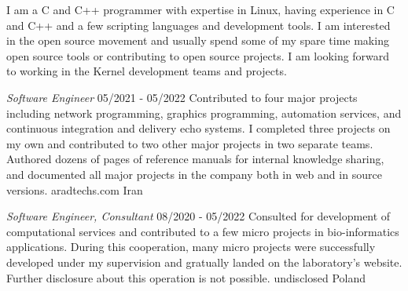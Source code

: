 \documentclass[a4paper,12pt]{memoir} %
\begin{document}
\userinformation %

\framebreak %


\CVDate




{I am a C and C++ programmer with expertise in Linux, having experience in C and C++ and a few scripting languages and development tools. I am interested in the open source movement and usually spend some of my spare time making open source tools or contributing to open source projects. I am looking forward to working in the Kernel development teams and projects.}


\SmallSep %




{\textit{Software Engineer}}
{05/2021 - 05/2022}
{Contributed to four major projects including
network programming, graphics programming,
automation services, and continuous integration
and delivery echo systems.
I completed three projects on my own and
contributed to two other major projects
in two separate teams.
Authored dozens of pages of reference manuals
for internal knowledge sharing, and documented
all major projects in the company both in web and 
in source versions.}
{aradtechs.com}
{Iran}


{\textit{Software Engineer, Consultant}}
{08/2020 - 05/2022}
{Consulted for development of computational
services and contributed to a few micro projects
in bio-informatics applications.
During this cooperation, many micro projects were
successfully developed under my supervision and
gratually landed on the laboratory's website.
Further disclosure about this operation is not possible.}
{undisclosed}
{Poland}
\end{document}
